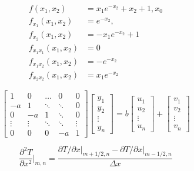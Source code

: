 \begin{align*}
	f(x_1,x_2)  &= x_1e^{-x_2} + x_2 + 1, x_0\\
	f_{x_1}(x_1,x_2) &= e^{-x_2},  \\
	f_{x_2}(x_1,x_2) &= -x_1e^{-x_2} +1  \\
	f_{{x_1}{x_1}}(x_1,x_2) &= 0  \\
	f_{{x_1}{x_2}}(x_1,x_2) &= -e^{-x_2}  \\
	f_{{x_2}{x_2}}(x_1,x_2) &= x_1e^{-x_2}  
\end{align*}

\[
	\begin{bmatrix}
		1 & 0 & \hdots & 0 & 0 \\
		-a & 1 & \ddots & \ddots & 0 \\
		0 & -a & 1 & \ddots & 0 \\
		\vdots & \vdots & \ddots & \ddots	 & \vdots \\
		0 & 0 & 0 & -a & 1 
	\end{bmatrix}
	\begin{bmatrix}
		y_1 \\
		y_2 \\
		\vdots \\
		y_n 
	\end{bmatrix} 
	=
	b
	\begin{bmatrix}
		u_1 \\
		u_2 \\
		\vdots \\
		u_n 
	\end{bmatrix}
	+
	\begin{bmatrix}
		v_1 \\
		v_2 \\
		\vdots \\
		v_n 
	\end{bmatrix}
\]

\begin{equation*}
	\frac{\partial^2T}{\partial x^2}\Bigg\vert_{m,n} = \frac{\partial T/\partial x\vert_{m+1/2,n}-\partial T/\partial x\vert_{m-1/2,n}}{\Delta x}
\end{equation*}

